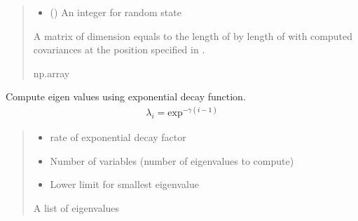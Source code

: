 \documentclass[letterpaper,10pt,english]{sphinxmanual}
\begin{document}
\begin{fulllineitems}
\begin{quote}
\begin{description}
\begin{itemize}
\item {} 
\sphinxAtStartPar
{} () \textendash{} An integer for random state

\end{itemize}

\sphinxAtStartPar
A matrix of dimension equals to the length of  by length of  with     computed covariances at the position specified in .

\sphinxAtStartPar
np.array

\end{description}\end{quote}

\end{fulllineitems}


\begin{fulllineitems}
\label{\detokenize{Utilities:pysimrel.utilities.get_eigen}}
\pysigstartsignatures
{}
\pysigstopsignatures
\sphinxAtStartPar
Compute eigen values using exponential decay function.
\begin{equation*}
\begin{split}\lambda_i = \text{exp}^{-\gamma(i-1)}\end{split}
\end{equation*}\begin{quote}\begin{description}
\begin{itemize}
\item {} 
\sphinxAtStartPar
{} \textendash{} rate of exponential decay factor

\item {} 
\sphinxAtStartPar
{} \textendash{} Number of variables (number of eigenvalues to compute)

\item {} 
\sphinxAtStartPar
{} \textendash{} Lower limit for smallest eigenvalue

\end{itemize}

\sphinxAtStartPar
A list of eigenvalues

\end{description}\end{quote}

\end{fulllineitems}
\end{document}
